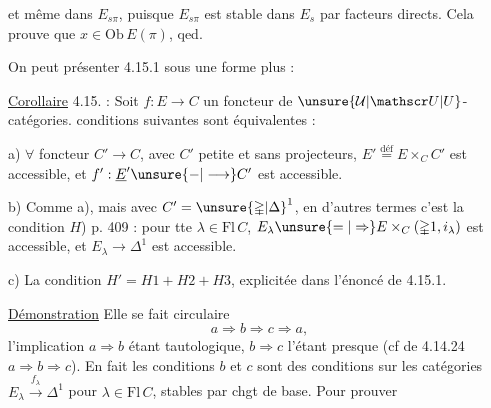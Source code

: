 et même dans $E_{s\pi}$, puisque $E_{s\pi}$ est stable dans $E_s$ par facteurs directs. Cela prouve que $x\in\mathrm{Ob}\,E(\pi)$, qed.

On peut présenter 4.15.1 sous une forme plus  :

\uline{Corollaire} 4.15. : Soit $f:E\longrightarrow C$ un foncteur de $\unsure{\mathcal U|\mathscr U|U}$-catégories.  conditions suivantes sont équivalentes :

a) $\forall$ foncteur $C'\longrightarrow C$, avec $C'$ petite et sans projecteurs, $E'\overset{\mathrm{déf}}{=}E\times_C C'$ est accessible, et $f':\underline E'\unsure{\mathord{-}|\longrightarrow}C'$ est accessible.

b) Comme a), mais avec $C'=\unsure{\mathbb{\Delta}|\Delta}^{1}$, en d'autres termes c'est la condition $H$) p. 409 : pour tte $\lambda\in\mathrm{Fl}\,C$, $E_\lambda\unsure{=|\Rightarrow}E\times_C(\mathbb{\Delta}1,i_\lambda)$ est accessible, et $E_\lambda\longrightarrow\mathbb{\Delta}^1$ est accessible.

c) La condition $H'=H1+H2+H3$, explicitée dans l'énoncé de 4.15.1.

\uline{Démonstration} Elle se fait circulaire
\[a\Longrightarrow b\Longrightarrow c\Longrightarrow a,\]
l'implication $a\Longrightarrow b$ étant tautologique, $b\Longrightarrow c$ l'étant presque (cf  de 4.14.24 $a\Longrightarrow b\Longrightarrow c$). En fait les conditions $b$ et $c$ sont des conditions sur les catégories $E_\lambda\xrightarrow{f_\lambda}\mathbb{\Delta}^1$ pour $\lambda\in\mathrm{Fl}\,C$,  stables par chgt de base. Pour prouver

